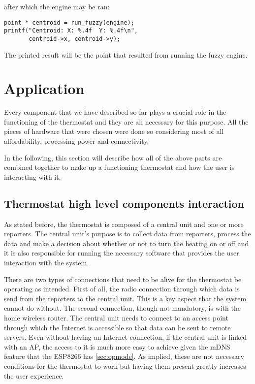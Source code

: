 after which the engine may be ran:
\begin{lstlisting}[frame=single]
point * centroid = run_fuzzy(engine);
printf("Centroid: X: %.4f  Y: %.4f\n",
       centroid->x, centroid->y);
\end{lstlisting}

The printed result will be the point that resulted from running the fuzzy engine.

\section{Application}
\label{sec:application}

\qquad Every component that we have described so far plays a crucial role in the functioning of the thermostat and
they are all necessary for this purpose. All the pieces of hardware that were chosen were done so considering
most of all affordability, processing power and connectivity.

In the following, this section will describe how all of the above parts are combined together to make up
a functioning thermostat and how the user is interacting with it.

\subsection{Thermostat high level components interaction}

\qquad As stated before, the thermostat is composed of a central unit and one or more reporters. The central unit's
purpose is to collect data from reporters, process the data and make a decision about whether or not to turn
the heating on or off and it is also responsible for running the necessary software that provides the user
interaction with the system.

\qquad There are two types of connections that need to be alive for the thermostat be operating as intended.
First of all, the radio connection through which data is send from the reporters to the central unit. This is
a key aspect that the system cannot do without.
The second connection, though not mandatory, is with the home wireless router. The central unit needs to
connect to an access point through which the Internet is accessible so that data can be sent to remote
servers. Even without having an Internet connection, if the central unit is linked with an AP, the access to
it is much more easy to achieve given the mDNS feature that the ESP8266 has \ref{sec:opmode}. As implied,
these are not necessary conditions for the thermostat to work but having them present greatly increases the
user experience.

